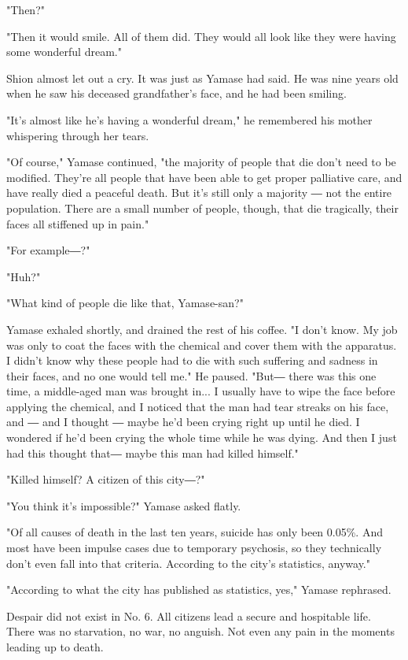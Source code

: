 "Then?"

"Then it would smile. All of them did. They would all look like they
were having some wonderful dream."

Shion almost let out a cry. It was just as Yamase had said. He was nine
years old when he saw his deceased grandfather's face, and he had been
smiling.

"It's almost like he's having a wonderful dream," he remembered his
mother whispering through her tears.

"Of course," Yamase continued, "the majority of people that die don't
need to be modified. They're all people that have been able to get
proper palliative care, and have really died a peaceful death. But it's
still only a majority ― not the entire population. There are a small
number of people, though, that die tragically, their faces all stiffened
up in pain."

"For example―?"

"Huh?"

"What kind of people die like that, Yamase-san?"

Yamase exhaled shortly, and drained the rest of his coffee. "I don't
know. My job was only to coat the faces with the chemical and cover them
with the apparatus. I didn't know why these people had to die with such
suffering and sadness in their faces, and no one would tell me." He
paused. "But― there was this one time, a middle-aged man was brought
in... I usually have to wipe the face before applying the chemical, and
I noticed that the man had tear streaks on his face, and ― and I thought
― maybe he'd been crying right up until he died. I wondered if he'd been
crying the whole time while he was dying. And then I just had this
thought that― maybe this man had killed himself."

"Killed himself? A citizen of this city―?"

"You think it's impossible?" Yamase asked flatly.

"Of all causes of death in the last ten years, suicide has only been
0.05\%. And most have been impulse cases due to temporary psychosis, so
they technically don't even fall into that criteria. According to the
city's statistics, anyway."

"According to what the city has published as statistics, yes," Yamase
rephrased.

Despair did not exist in No. 6. All citizens lead a secure and
hospitable life. There was no starvation, no war, no anguish. Not even
any pain in the moments leading up to death.

